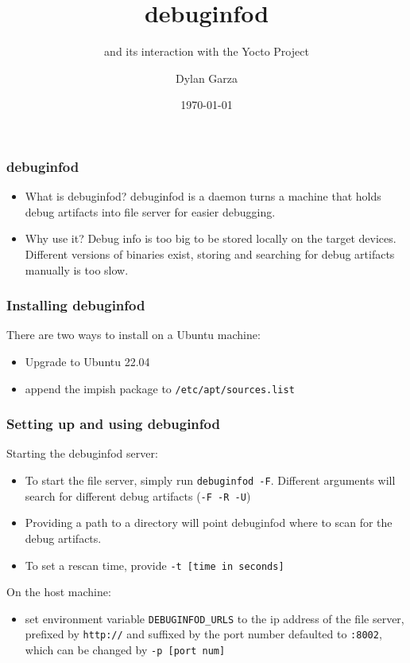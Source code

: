 \documentclass[10pt]{beamer}
\title{debuginfod}
\subtitle{and its interaction with the 
Yocto Project}
\author{Dylan Garza}
\date{\today}
\begin{document}
\frame{\titlepage}

\begin{frame}
   \frametitle{debuginfod}
   \vspace{-1cm}
   \begin{itemize}
      \item What is debuginfod?
      debuginfod is a daemon turns a machine that
      holds debug artifacts into file server for
      easier debugging. \\
      \vspace{.5cm}
      \item Why use it?
      Debug info is too big to be stored locally
      on the target devices. Different versions 
      of binaries exist, storing and searching 
      for debug artifacts manually is too slow.
   \end{itemize}
\end{frame}

\begin{frame}[fragile]
   \frametitle{Installing debuginfod}
   \vspace{-1cm}
   \noindent
   There are two ways to install on a Ubuntu machine:
   \begin{itemize}
      \item Upgrade to Ubuntu 22.04
      \item append the impish package to \verb|/etc/apt/sources.list|
   \end{itemize}
\end{frame}

\begin{frame}[fragile]
   \frametitle{Setting up and using debuginfod}
   \vspace{-1cm}
   Starting the debuginfod server:
   \begin{itemize}
      \item To start the file server, simply run \verb|debuginfod -F|. 
         Different arguments will search for different debug artifacts (\verb|-F -R -U|)
      \item Providing a path to a directory will point debuginfod where to scan for the debug artifacts.
      \item To set a rescan time, provide \verb|-t [time in seconds]|
   \end{itemize}
   On the host machine:
   \begin{itemize}
      \item set environment variable \verb|DEBUGINFOD_URLS| to the ip address 
         of the file server, prefixed by \verb|http://| and suffixed by the 
         port number defaulted to \verb|:8002|, which can be changed by \verb|-p [port num]|
   \end{itemize}
\end{frame}
\end{document}
